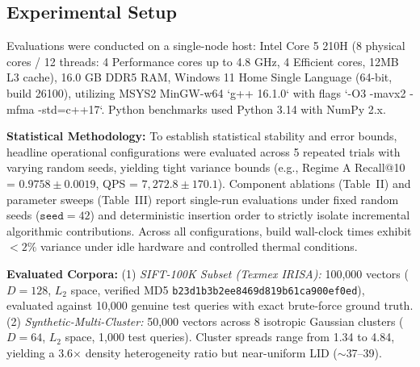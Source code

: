 \documentclass[conference,10pt]{IEEEtran}
\begin{document}
\subsection{Experimental Setup}
Evaluations were conducted on a single-node host: Intel Core 5 210H (8 physical cores / 12 threads: 4 Performance cores up to 4.8 GHz, 4 Efficient cores, 12MB L3 cache), 16.0 GB DDR5 RAM, Windows 11 Home Single Language (64-bit, build 26100), utilizing MSYS2 MinGW-w64 `g++ 16.1.0` with flags `-O3 -mavx2 -mfma -std=c++17`. Python benchmarks used Python 3.14 with NumPy 2.x.

\textbf{Statistical Methodology:} To establish statistical stability and error bounds, headline operational configurations were evaluated across 5 repeated trials with varying random seeds, yielding tight variance bounds (e.g., Regime A Recall@10 = $0.9758 \pm 0.0019$, QPS = $7,272.8 \pm 170.1$). Component ablations (Table~II) and parameter sweeps (Table~III) report single-run evaluations under fixed random seeds ($\texttt{seed}=42$) and deterministic insertion order to strictly isolate incremental algorithmic contributions. Across all configurations, build wall-clock times exhibit $<2\%$ variance under idle hardware and controlled thermal conditions.

\textbf{Evaluated Corpora:}
(1) \textit{SIFT-100K Subset (Texmex IRISA):} 100,000 vectors ($D=128$, $L_2$ space, verified MD5 \texttt{b23d1b3b2ee8469d819b61ca900ef0ed}), evaluated against 10,000 genuine test queries with exact brute-force ground truth.
(2) \textit{Synthetic-Multi-Cluster:} 50,000 vectors across 8 isotropic Gaussian clusters ($D=64$, $L_2$ space, 1,000 test queries). Cluster spreads range from 1.34 to 4.84, yielding a 3.6$\times$ density heterogeneity ratio but near-uniform LID ($\sim$37--39).
\end{document}
